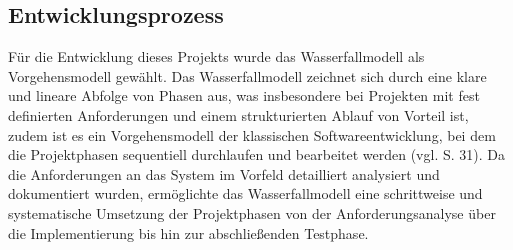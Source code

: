 \subsection{Entwicklungsprozess}
\label{sec:Entwicklungsprozess}
Für die Entwicklung dieses Projekts wurde das Wasserfallmodell als Vorgehensmodell gewählt. 
Das Wasserfallmodell zeichnet sich durch eine klare und lineare Abfolge von Phasen aus, was insbesondere bei Projekten mit fest 
definierten Anforderungen und einem strukturierten Ablauf von Vorteil ist, zudem ist es ein Vorgehensmodell der klassischen Softwareentwicklung, bei dem die Projektphasen sequentiell 
durchlaufen und bearbeitet werden (vgl. \cite{FittkauRuf2008} S. 31). 
Da die Anforderungen an das System im Vorfeld detailliert analysiert und dokumentiert wurden, ermöglichte das Wasserfallmodell 
eine schrittweise und systematische Umsetzung der Projektphasen von der Anforderungsanalyse über die Implementierung bis hin zur abschließenden Testphase.

